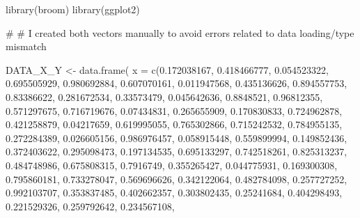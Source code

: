 \documentclass[
  11pt,
]{article}
\newenvironment{Shaded}{\begin{snugshade}}{\end{snugshade}}
\newcommand{\AttributeTok}[1]{\textcolor[rgb]{0.40,0.45,0.13}{#1}}
\newcommand{\CommentTok}[1]{\textcolor[rgb]{0.37,0.37,0.37}{#1}}
\newcommand{\FloatTok}[1]{\textcolor[rgb]{0.68,0.00,0.00}{#1}}
\newcommand{\FunctionTok}[1]{\textcolor[rgb]{0.28,0.35,0.67}{#1}}
\newcommand{\NormalTok}[1]{\textcolor[rgb]{0.00,0.23,0.31}{#1}}
\newcommand{\OtherTok}[1]{\textcolor[rgb]{0.00,0.23,0.31}{#1}}
\begin{document}
\begin{Shaded}
\begin{Highlighting}[]
\FunctionTok{library}\NormalTok{(broom)}
\FunctionTok{library}\NormalTok{(ggplot2)}


\CommentTok{\# \# I created both vectors manually to avoid errors related to data loading/type mismatch }

\NormalTok{DATA\_X\_Y }\OtherTok{\textless{}{-}} \FunctionTok{data.frame}\NormalTok{(}
  \AttributeTok{x =} \FunctionTok{c}\NormalTok{(}\FloatTok{0.172038167}\NormalTok{, }\FloatTok{0.418466777}\NormalTok{, }\FloatTok{0.054523322}\NormalTok{, }\FloatTok{0.695505929}\NormalTok{, }\FloatTok{0.980692884}\NormalTok{, }\FloatTok{0.607070161}\NormalTok{, }
        \FloatTok{0.011947568}\NormalTok{, }\FloatTok{0.435136626}\NormalTok{, }\FloatTok{0.894557753}\NormalTok{, }\FloatTok{0.83386622}\NormalTok{, }\FloatTok{0.281672534}\NormalTok{, }\FloatTok{0.33573479}\NormalTok{, }
        \FloatTok{0.045642636}\NormalTok{, }\FloatTok{0.8848521}\NormalTok{, }\FloatTok{0.96812355}\NormalTok{, }\FloatTok{0.571297675}\NormalTok{, }\FloatTok{0.716719676}\NormalTok{, }\FloatTok{0.07434831}\NormalTok{, }
        \FloatTok{0.265655909}\NormalTok{, }\FloatTok{0.170830833}\NormalTok{, }\FloatTok{0.724962878}\NormalTok{, }\FloatTok{0.421258879}\NormalTok{, }\FloatTok{0.04217659}\NormalTok{, }\FloatTok{0.619995055}\NormalTok{, }
        \FloatTok{0.765302866}\NormalTok{, }\FloatTok{0.715242532}\NormalTok{, }\FloatTok{0.784955135}\NormalTok{, }\FloatTok{0.272284389}\NormalTok{, }\FloatTok{0.026605156}\NormalTok{, }\FloatTok{0.986976457}\NormalTok{, }
        \FloatTok{0.058915448}\NormalTok{, }\FloatTok{0.559899994}\NormalTok{, }\FloatTok{0.149852436}\NormalTok{, }\FloatTok{0.372403622}\NormalTok{, }\FloatTok{0.295098473}\NormalTok{, }\FloatTok{0.197134535}\NormalTok{, }
        \FloatTok{0.695133297}\NormalTok{, }\FloatTok{0.742518261}\NormalTok{, }\FloatTok{0.825313237}\NormalTok{, }\FloatTok{0.484748986}\NormalTok{, }\FloatTok{0.675808315}\NormalTok{, }\FloatTok{0.7916749}\NormalTok{, }
        \FloatTok{0.355265427}\NormalTok{, }\FloatTok{0.044775931}\NormalTok{, }\FloatTok{0.169300308}\NormalTok{, }\FloatTok{0.795860181}\NormalTok{, }\FloatTok{0.733278047}\NormalTok{, }\FloatTok{0.569696626}\NormalTok{, }
        \FloatTok{0.342122064}\NormalTok{, }\FloatTok{0.482784098}\NormalTok{, }\FloatTok{0.257727252}\NormalTok{, }\FloatTok{0.992103707}\NormalTok{, }\FloatTok{0.353837485}\NormalTok{, }\FloatTok{0.402662357}\NormalTok{, }
        \FloatTok{0.303802435}\NormalTok{, }\FloatTok{0.25241684}\NormalTok{, }\FloatTok{0.404298493}\NormalTok{, }\FloatTok{0.221529326}\NormalTok{, }\FloatTok{0.259792642}\NormalTok{, }\FloatTok{0.234567108}\NormalTok{, }

\end{Highlighting}
\end{Shaded}
\end{document}
